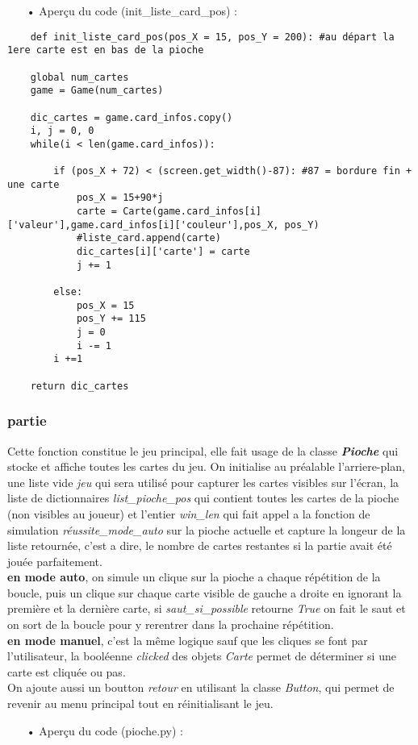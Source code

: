 	\begin{itemize}
	\color{blue}\item[•]Aperçu du code (init\_liste\_card\_pos) :
	\end{itemize}
	
	\begin{lstlisting}
	def init_liste_card_pos(pos_X = 15, pos_Y = 200): #au départ la 1ere carte est en bas de la pioche
    
    global num_cartes
    game = Game(num_cartes)

    dic_cartes = game.card_infos.copy()
    i, j = 0, 0
    while(i < len(game.card_infos)):

        if (pos_X + 72) < (screen.get_width()-87): #87 = bordure fin + une carte
            pos_X = 15+90*j
            carte = Carte(game.card_infos[i]['valeur'],game.card_infos[i]['couleur'],pos_X, pos_Y)
            #liste_card.append(carte)
            dic_cartes[i]['carte'] = carte
            j += 1
        
        else:
            pos_X = 15
            pos_Y += 115
            j = 0
            i -= 1
        i +=1
    
    return dic_cartes
	\end{lstlisting}
	
	\subsubsection{partie}
	Cette fonction constitue le jeu principal, elle fait usage de la classe \textbf{\emph{Pioche}} qui stocke et affiche toutes les cartes du jeu. On initialise au préalable l'arriere-plan, une liste vide \emph{jeu} qui sera utilisé pour capturer les cartes visibles sur l'écran, la liste de dictionnaires \emph{list\_pioche\_pos} qui contient toutes les cartes de la pioche (non visibles au joueur) et l'entier \emph{win\_len} qui fait appel a la fonction de simulation \emph{réussite\_mode\_auto} sur la pioche actuelle et capture la longeur de la liste retournée, c'est a dire, le nombre de cartes restantes si la partie avait été jouée parfaitement.\\
	\textbf{en mode auto}, on simule un clique sur la pioche a chaque répétition de la boucle, puis un clique sur chaque carte visible de gauche a droite en ignorant la première et la dernière carte, si \emph{saut\_si\_possible} retourne \emph{True} on fait le saut et on sort de la boucle pour y rerentrer dans la prochaine répétition.\\
	\textbf{en mode manuel}, c'est la même logique sauf que les cliques se font par l'utilisateur, la booléenne \emph{clicked} des objets \emph{Carte} permet de déterminer si une carte est cliquée ou pas.\\
	On ajoute aussi un boutton \emph{retour} en utilisant la classe \emph{Button}, qui permet de revenir au menu principal tout en réinitialisant le jeu.
	\\
	\begin{itemize}
	\color{blue}\item[•]Aperçu du code (pioche.py) :
	\end{itemize}
	
